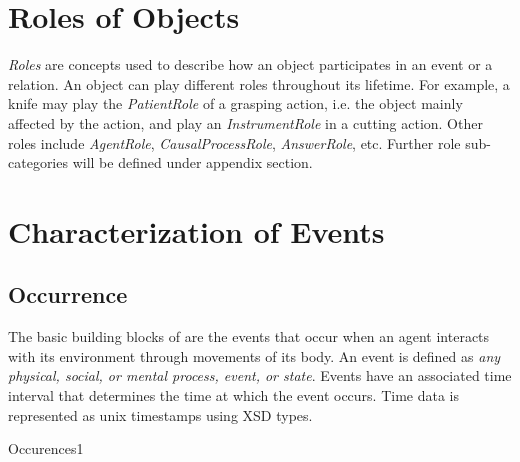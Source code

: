 \section{Roles of Objects}
\label{sec:narrative:roles}

\emph{Roles} are concepts used to describe how an object participates in an event or a relation. An object can play different roles throughout its lifetime. For example, a knife may play the \emph{PatientRole} of a grasping action, i.e. the object mainly affected by the action, and play an \emph{InstrumentRole} in a cutting action. Other roles include \emph{AgentRole}, \emph{CausalProcessRole}, \emph{AnswerRole}, %
etc. Further role sub-categories will be defined under appendix section. 


\section{Characterization of Events}
\label{sec:narrative:relations} 

\subsection{Occurrence}
\label{sec:occurrences}
The basic building blocks of \neems are the events that occur when an agent interacts with its environment through movements of its body.
An event is defined as \emph{any physical, social, or mental process, event, or state}. Events have an associated time interval that determines the time at which the event occurs. Time data is represented as unix timestamps using XSD types.

\begin{ODP}{Occurences1}
\end{ODP}

